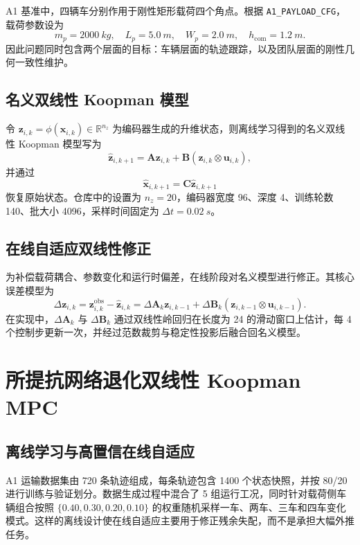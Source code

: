 \documentclass[twocolumn,3p,times,procedia]{elsarticle}
\begin{document}
A1 基准中，四辆车分别作用于刚性矩形载荷四个角点。根据 \texttt{A1\_PAYLOAD\_CFG}，载荷参数设为
\begin{equation}
m_p=\SI{2000}{kg},\quad L_p=\SI{5.0}{m},\quad W_p=\SI{2.0}{m},\quad h_{\text{com}}=\SI{1.2}{m}.
\end{equation}
因此问题同时包含两个层面的目标：车辆层面的轨迹跟踪，以及团队层面的刚性几何一致性维护。

\subsection{名义双线性 Koopman 模型}
令 $\bm{z}_{i,k}=\phi(\bm{x}_{i,k})\in\mathbb{R}^{n_z}$ 为编码器生成的升维状态，则离线学习得到的名义双线性 Koopman 模型写为
\begin{equation}
\hat{\bm{z}}_{i,k+1}=\bm{A}\bm{z}_{i,k}+\bm{B}\left(\bm{z}_{i,k}\otimes \bm{u}_{i,k}\right),
\label{eq:zh_nominal_bilinear}
\end{equation}
并通过
\begin{equation}
\hat{\bm{x}}_{i,k+1}=\bm{C}\hat{\bm{z}}_{i,k+1}
\end{equation}
恢复原始状态。仓库中的设置为 $n_z=20$，编码器宽度 96、深度 4、训练轮数 140、批大小 4096，采样时间固定为 $\Delta t=\SI{0.02}{s}$。

\subsection{在线自适应双线性修正}
为补偿载荷耦合、参数变化和运行时偏差，在线阶段对名义模型进行修正。其核心误差模型为
\begin{equation}
\Delta\bm{z}_{i,k}=\bm{z}^{\text{obs}}_{i,k}-\hat{\bm{z}}_{i,k}
=\Delta \bm{A}_{k}\bm{z}_{i,k-1}+\Delta \bm{B}_{k}\left(\bm{z}_{i,k-1}\otimes \bm{u}_{i,k-1}\right).
\label{eq:zh_delta_model}
\end{equation}
在实现中，$\Delta \bm{A}_{k}$ 与 $\Delta \bm{B}_{k}$ 通过双线性岭回归在长度为 24 的滑动窗口上估计，每 4 个控制步更新一次，并经过范数裁剪与稳定性投影后融合回名义模型。

\section{所提抗网络退化双线性 Koopman MPC}
\subsection{离线学习与高置信在线自适应}
A1 运输数据集由 720 条轨迹组成，每条轨迹包含 1400 个状态快照，并按 80/20 进行训练与验证划分。数据生成过程中混合了 5 组运行工况，同时针对载荷侧车辆组合按照 $\{0.40,0.30,0.20,0.10\}$ 的权重随机采样一车、两车、三车和四车变化模式。这样的离线设计使在线自适应主要用于修正残余失配，而不是承担大幅外推任务。
\end{document}
